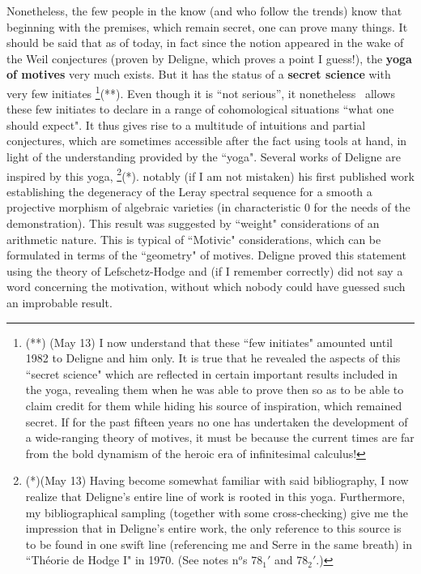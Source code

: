 Nonetheless, the few people in the know (and who follow the trends)
know that beginning with the premises, which remain secret, one can prove many things. 
It should be said that as of today, 
in fact since the notion appeared in the wake of the Weil conjectures
(proven by Deligne, which proves a point I guess!), the \textbf{yoga of motives} very much
exists. 
But it has the status of a \textbf{secret science} with very few 
initiates
\footnote{(**) (May 13) I now understand that these ``few initiates" amounted until 1982 to Deligne and him only. It is true that he revealed the aspects of this ``secret science" which are reflected in certain important results included in the yoga, revealing them when he was able to prove then so as to be able to claim credit for them while hiding his source of inspiration, which remained secret. If for the past fifteen years no one has undertaken the development of a wide-ranging theory of motives, it must be because the current times are far from the bold dynamism of the heroic era of infinitesimal calculus!}(**).
Even though it is ``not serious'', it nonetheless\
allows these few initiates to declare in a range of cohomological situations 
``what one should expect".
It thus gives rise to a multitude of intuitions and partial conjectures, which are
sometimes accessible after the fact using tools at hand, 
in light of the understanding provided by the ``yoga". 
Several works of Deligne are inspired by this 
yoga, 
\footnote{(*)(May 13) Having become somewhat familiar with said bibliography, I now realize that Deligne's entire line of work is rooted in this yoga. Furthermore, my bibliographical sampling (together with some cross-checking) give me the impression that in Deligne's entire work, the only reference to this source is to be found in one swift line (referencing me and Serre in the same breath) in ``Th\'eorie de Hodge I" in 1970. (See notes n$^o$s $78_1'$ and $78_2'$.)}(*).
notably (if I am not mistaken) his first published work establishing the degeneracy
of the Leray spectral sequence for a smooth a projective morphism of algebraic
varieties (in characteristic $0$ for the needs of the demonstration).
This result was suggested by ``weight" considerations of an arithmetic nature. 
This is typical of ``Motivic" considerations, which can be formulated in terms of the
``geometry" of motives.
Deligne proved this statement using the theory of Lefschetz-Hodge and (if I remember
correctly) did not say a word concerning the motivation, without which nobody could have
guessed such an improbable result. 

